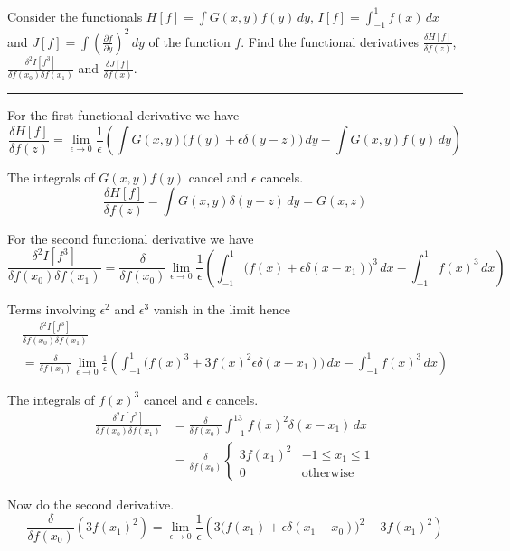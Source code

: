 \documentclass[12pt]{article}
\begin{document}
Consider the functionals
$H[f]=\int G(x,y)f(y)\,dy$,
$I[f]=\int_{-1}^1f(x)\,dx$
and
$J[f]=\int\left(\frac{\partial f}{\partial y}\right)^2\,dy$
of the function $f$.
Find the functional derivatives
$\frac{\delta H[f]}{\delta f(z)}$,
$\frac{\delta^2I[f^3]}{\delta f(x_0)\delta f(x_1)}$
and
$\frac{\delta J[f]}{\delta f(x)}$.

\bigskip
\hrule

\bigskip
For the first functional derivative we have
\begin{equation*}
\frac{\delta H[f]}{\delta f(z)}
=\lim_{\epsilon\rightarrow0}\frac{1}{\epsilon}
\left(
\int G(x,y)\big(f(y)+\epsilon\delta(y-z)\big)\,dy
-\int G(x,y)f(y)\,dy
\right)
\end{equation*}

The integrals of $G(x,y)f(y)$ cancel and $\epsilon$ cancels.
\begin{equation*}
\frac{\delta H[f]}{\delta f(z)}=\int G(x,y)\delta(y-z)\,dy=G(x,z)
\end{equation*}

For the second functional derivative we have
\begin{equation*}
\frac{\delta^2 I[f^3]}{\delta f(x_0)\delta f(x_1)}
=\frac{\delta}{\delta f(x_0)}
\lim_{\epsilon\rightarrow0}\frac{1}{\epsilon}
\left(
\int_{-1}^{1}\big(f(x)+\epsilon\delta(x-x_1)\big)^3\,dx
-\int_{-1}^{1}f(x)^3\,dx
\right)
\end{equation*}

Terms involving $\epsilon^2$ and $\epsilon^3$ vanish in the limit hence
\begin{multline*}
\frac{\delta^2 I[f^3]}{\delta f(x_0)\delta f(x_1)}
\\
=\frac{\delta}{\delta f(x_0)}
\lim_{\epsilon\rightarrow0}\frac{1}{\epsilon}
\left(
\int_{-1}^1\big(f(x)^3+3f(x)^2\epsilon\delta(x-x_1)\big)\,dx-\int_{-1}^{1}f(x)^3\,dx
\right)
\end{multline*}

The integrals of $f(x)^3$ cancel and $\epsilon$ cancels.
\begin{align*}
\frac{\delta^2 I[f^3]}{\delta f(x_0)\delta f(x_1)}
&=\frac{\delta}{\delta f(x_0)}\int_{-1}^13f(x)^2\delta(x-x_1)\,dx
\\
&=\frac{\delta}{\delta f(x_0)}
\begin{cases}
3f(x_1)^2 & -1\le x_1\le 1
\\
0 & \text{otherwise}
\end{cases}
\tag{1}
\end{align*}

Now do the second derivative.
\begin{equation*}
\frac{\delta}{\delta f(x_0)}\left(3f(x_1)^2\right)
=\lim_{\epsilon\rightarrow0}\frac{1}{\epsilon}
\left(
3\big(f(x_1)+\epsilon\delta(x_1-x_0)\big)^2-3f(x_1)^2
\right)
\end{equation*}
\end{document}
